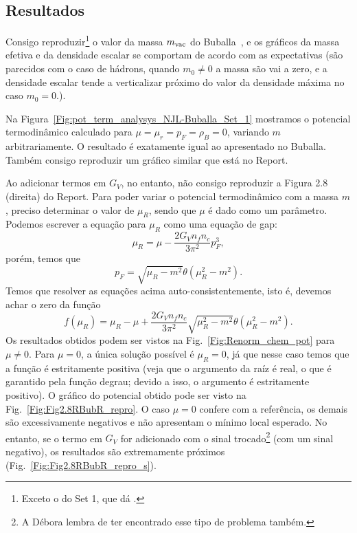 \subsection{Resultados}

Consigo reproduzir\footnote{Exceto o do Set 1, que dá .} o valor da massa $m_{\rm{vac}}$ do Buballa~\cite{Buballa1996}, e os gráficos da massa efetiva e da densidade escalar se comportam de acordo com as expectativas (são parecidos com o caso de hádrons, quando $m_0 \neq 0$ a massa são vai a zero, e a densidade escalar tende a verticalizar próximo do valor da densidade máxima no caso $m_0 = 0$.).

Na Figura~\ref{Fig:pot_term_analysys_NJL-Buballa_Set_1} mostramos o potencial termodinâmico calculado para $\mu = \mu_r = p_F = \rho_B = 0$, variando $m$ arbitrariamente. O resultado é exatamente igual ao apresentado no Buballa. Também consigo reproduzir um gráfico similar que está no Report.

Ao adicionar termos em $G_V$, no entanto, não consigo reproduzir a Figura 2.8 (direita) do Report. Para poder variar o potencial termodinâmico com a massa $m$, preciso determinar o valor de $\mu_R$, sendo que $\mu$ é dado como um parâmetro. Podemos escrever a equação para $\mu_R$ como uma equação de gap:
\begin{equation}\label{Eq:Renorm_chem_pot_auto_1}
	\mu_R = \mu - \frac{2G_V n_fn_c}{3\pi^2}p_F^3,
\end{equation}
%
porém, temos que
\begin{equation}\label{Eq:Renorm_chem_pot_auto_2}
	p_F = \sqrt{\mu_R - m^2} \theta(\mu_R^2 - m^2).
\end{equation}
%
Temos que resolver as equações acima auto-consistentemente, isto é, devemos achar o zero da função
\begin{equation}
	f(\mu_R) = \mu_R - \mu + \frac{2G_V n_fn_c}{3\pi^2} \sqrt{\mu_R^2 - m^2}\theta(\mu_R^2 - m^2).
\end{equation}
%
Os resultados obtidos podem ser vistos na Fig.~\ref{Fig:Renorm_chem_pot} para $\mu \neq 0$. Para $\mu = 0$, a única solução possível é $\mu_R = 0$, já que nesse caso temos que a função é estritamente positiva (veja que o argumento da raíz é real, o que é garantido pela função degrau; devido a isso, o argumento é estritamente positivo). O gráfico do potencial obtido pode ser visto na Fig.~\ref{Fig:Fig2.8RBubR_repro}. O caso $\mu = 0$ confere com a referência, os demais são excessivamente negativos e não apresentam o mínimo local esperado. No entanto, se o termo em $G_V$ for adicionado com o sinal trocado\footnote{A Débora lembra de ter encontrado esse tipo de problema também.} (com um sinal negativo), os resultados são extremamente próximos (Fig.~\ref{Fig:Fig2.8RBubR_repro_s}).

